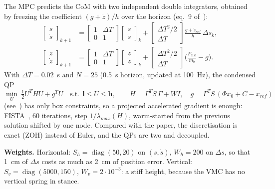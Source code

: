\documentclass[11pt,a4paper]{article}
\begin{document}
The MPC predicts the CoM with two independent double integrators, obtained by freezing the
coefficient $(g+\ddot z)/h$ over the horizon (eq.~9 of~\cite{cui2022}):
\begin{align}
    \begin{bmatrix}s\\ \dot s\end{bmatrix}_{k+1} &= \begin{bmatrix}1&\Delta T\\0&1\end{bmatrix}\begin{bmatrix}s\\ \dot s\end{bmatrix}_k
    + \begin{bmatrix}\Delta T^2/2\\ \Delta T\end{bmatrix}\frac{g+\ddot z_{ref}}{h}\,\Delta s_k,\\
    \begin{bmatrix}z\\ \dot z\end{bmatrix}_{k+1} &= \begin{bmatrix}1&\Delta T\\0&1\end{bmatrix}\begin{bmatrix}z\\ \dot z\end{bmatrix}_k
    + \begin{bmatrix}\Delta T^2/2\\ \Delta T\end{bmatrix}\Big(\frac{F_{z,k}}{m_b}-g\Big).
\end{align}
With $\Delta T = 0.02$~s and $N = 25$ (0.5~s horizon, updated at 100~Hz), the condensed QP
\begin{equation}
    \min_{U}\ \tfrac12 U^{T}HU + g^{T}U\quad \text{s.t.}\ \ \bm{l}\le U\le \bm{h},\qquad
    H = \Gamma^{T}\bar S\,\Gamma + W I,\quad g = \Gamma^{T}\bar S\,(\Phi x_0 + C - x_{ref})
\end{equation}
(see~\cite{rawlings2017}) has only box constraints, so a projected accelerated gradient is enough: FISTA~\cite{beck2009},
60 iterations, step $1/\lambda_{max}(H)$, warm-started from the previous solution shifted by one
node.  Compared with the paper, the discretisation is exact (ZOH) instead of Euler, and the QPs
are two and decoupled.

\textbf{Weights.}  Horizontal: $S_h = \operatorname{diag}(50, 20)$ on $(s,\dot s)$, $W_h = 200$ on
$\Delta s$, so that 1~cm of $\Delta s$ costs as much as 2~cm of position error.  Vertical:
$S_v = \operatorname{diag}(5000, 150)$, $W_v = 2\cdot10^{-3}$: a stiff height, because the VMC has
no vertical spring in stance.
\end{document}
